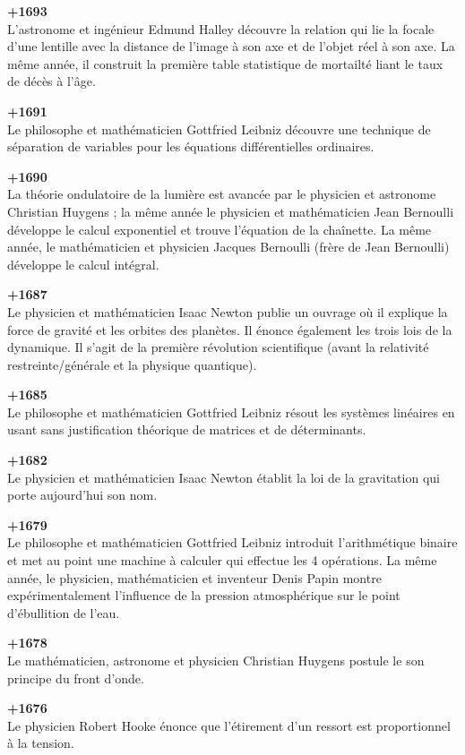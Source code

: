 \textbf{+1693}\\
L'astronome et ingénieur Edmund Halley découvre la relation qui lie la focale d'une lentille avec la distance de l'image à son axe et de l'objet réel à son axe. La même année, il construit la première table statistique de mortailté liant le taux de décès à l'âge.

\textbf{+1691}\\
Le philosophe et mathématicien Gottfried Leibniz découvre une technique de séparation de variables pour les équations différentielles ordinaires.

\textbf{+1690}\\
La théorie ondulatoire de la lumière est avancée par le physicien et astronome Christian Huygens ; la même année le physicien et mathématicien Jean Bernoulli développe le calcul exponentiel et trouve l'équation de la chaînette. La même année, le mathématicien et physicien Jacques Bernoulli (frère de Jean Bernoulli) développe le calcul intégral.

\textbf{+1687}\\
Le physicien et mathématicien Isaac Newton publie un ouvrage où il explique la force de gravité et les orbites des planètes. Il énonce également les trois lois de la dynamique. Il s'agit de la première révolution scientifique (avant la relativité restreinte/générale et la physique quantique).

\textbf{+1685}\\
Le philosophe et mathématicien Gottfried Leibniz résout les systèmes linéaires en usant sans justification théorique de matrices et de déterminants.

\textbf{+1682}\\
Le physicien et mathématicien Isaac Newton établit la loi de la gravitation qui porte aujourd'hui son nom.

\textbf{+1679}\\
Le philosophe et mathématicien Gottfried Leibniz introduit l'arithmétique binaire et met au point une machine à calculer qui effectue les 4 opérations. La même année, le physicien, mathématicien et inventeur Denis Papin montre expérimentalement l'influence de la pression atmosphérique sur le point d'ébullition de l'eau.

\textbf{+1678}\\
Le mathématicien, astronome et physicien Christian Huygens postule le son principe du front d'onde.

\textbf{+1676}\\
Le physicien Robert Hooke énonce que l'étirement d'un ressort est proportionnel à la tension.

